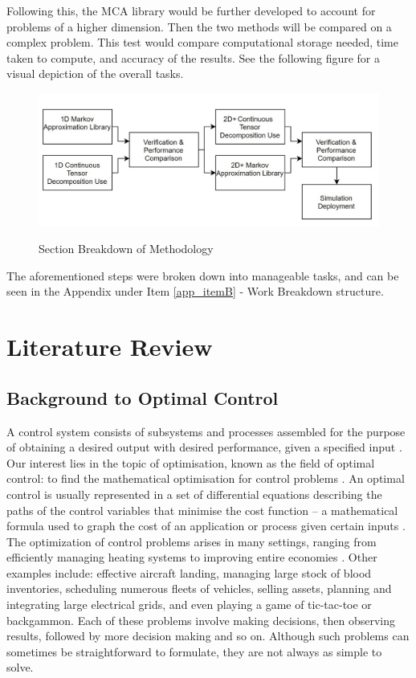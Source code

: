 \documentclass[11pt,draftd]{article}
\begin{document}
Following this, the MCA library would be further developed to account for problems of a higher dimension. Then the two methods will be compared on a complex problem. This test would compare computational storage needed, time taken to compute, and accuracy of the results. See the following figure for a visual depiction of the overall tasks.

\begin{figure}[h]
	\centering
	\includegraphics[scale=0.4]{images/WorkBreakdownMethodologyFigure}
	\label{WorkBreakdownMethodologyFigure}
	\caption{Section Breakdown of Methodology}
\end{figure}

The aforementioned steps were broken down into manageable tasks, and can be seen in the Appendix under Item \ref{app_itemB} - Work Breakdown structure. 
\newpage
\section{Literature Review} 
\subsection{Background to Optimal Control}
A control system consists of subsystems and processes assembled for the purpose of obtaining a desired output with desired performance, given a specified input \cite{nise}. Our interest lies in the topic of optimisation, known as the field of optimal control: to find the mathematical optimisation for control problems \cite{ieeeControl}. An optimal control is usually represented in a set of differential equations describing the paths of the control variables that minimise the cost function -- a mathematical formula used to graph the cost of an application or process given certain inputs \cite{costfunction}. \\

The optimization of control problems arises in many settings, ranging from efficiently managing heating systems to improving entire economies \cite{powell}. Other examples include: effective aircraft landing, managing large stock of blood inventories, scheduling numerous fleets of vehicles, selling assets, planning and integrating large electrical grids, and even playing a game of tic-tac-toe or backgammon. Each of these problems involve making decisions, then observing results, followed by more decision making and so on. Although such problems can sometimes be straightforward to formulate, they are not always as simple to solve. \\
\end{document}
